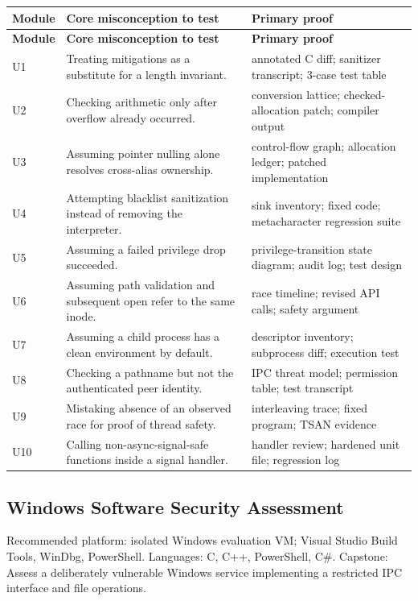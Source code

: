\documentclass[10pt,letterpaper]{article}
\begin{document}
\begingroup\footnotesize\setlength\tabcolsep{3pt}
\begin{longtable}{>{\raggedright\arraybackslash}p{}>{\raggedright\arraybackslash}p{}>{\raggedright\arraybackslash}p{}}\toprule
\textbf{Module} & \textbf{Core misconception to test} & \textbf{Primary proof}\\\midrule\endfirsthead
\toprule \textbf{Module} & \textbf{Core misconception to test} & \textbf{Primary proof}\\\midrule\endhead
U1 & Treating mitigations as a substitute for a length invariant. & annotated C diff; sanitizer transcript; 3-case test table\\\midrule
U2 & Checking arithmetic only after overflow already occurred. & conversion lattice; checked-allocation patch; compiler output\\\midrule
U3 & Assuming pointer nulling alone resolves cross-alias ownership. & control-flow graph; allocation ledger; patched implementation\\\midrule
U4 & Attempting blacklist sanitization instead of removing the interpreter. & sink inventory; fixed code; metacharacter regression suite\\\midrule
U5 & Assuming a failed privilege drop succeeded. & privilege-transition state diagram; audit log; test design\\\midrule
U6 & Assuming path validation and subsequent open refer to the same inode. & race timeline; revised API calls; safety argument\\\midrule
U7 & Assuming a child process has a clean environment by default. & descriptor inventory; subprocess diff; execution test\\\midrule
U8 & Checking a pathname but not the authenticated peer identity. & IPC threat model; permission table; test transcript\\\midrule
U9 & Mistaking absence of an observed race for proof of thread safety. & interleaving trace; fixed program; TSAN evidence\\\midrule
U10 & Calling non-async-signal-safe functions inside a signal handler. & handler review; hardened unit file; regression log\\\midrule
\bottomrule\end{longtable}\endgroup
\subsection{Windows Software Security Assessment}
Recommended platform: isolated Windows evaluation VM; Visual Studio Build Tools, WinDbg, PowerShell. Languages: C, C++, PowerShell, C\#. Capstone: Assess a deliberately vulnerable Windows service implementing a restricted IPC interface and file operations.
\end{document}
